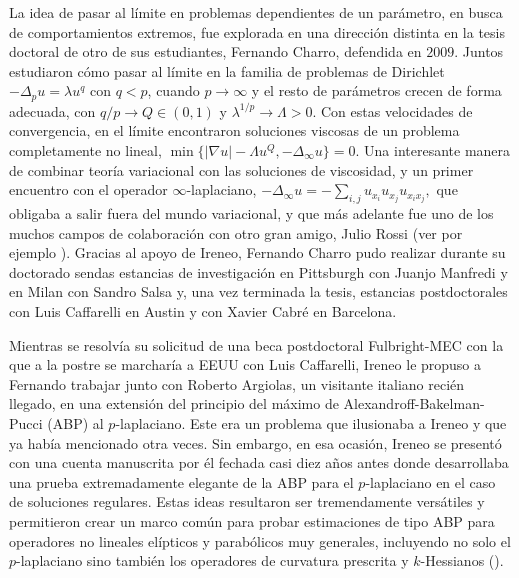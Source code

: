 La idea de pasar al l\'imite en problemas dependientes de un par\'ametro, en busca de comportamientos extremos, fue explorada en una direcci\'on distinta en la tesis doctoral de otro de sus estudiantes, Fernando Charro, defendida en $2009$. Juntos estudiaron c\'omo pasar al l\'imite en la familia de problemas de Dirichlet $ -\Delta_p u = \lambda u^q $ con $ q<p$, cuando $ p \to \infty $ y el resto de par\'ametros crecen de forma adecuada, con $ q/p \to Q \in (0,1) $ y $ \lambda^{1/p} \to \Lambda >0$. Con estas velocidades de convergencia, en el l\'imite encontraron soluciones viscosas de un problema completamente no lineal, $\min \{ |\nabla u|-\Lambda u^Q, - \Delta_{\infty} u \} = 0 $. Una interesante manera de combinar teor\'ia variacional con las soluciones de viscosidad, y un primer encuentro con el operador $\infty$-laplaciano, $-\Delta_{\infty} u = - \sum\limits_{i,j} u_{x_i} u_{x_j} u_{x_i x_j},$ que obligaba a salir fuera del mundo variacional, y que m\'as adelante fue uno de los muchos campos de colaboraci\'on con otro gran amigo, {Julio Rossi} {(ver por ejemplo \cite{GMPR})}. 
Gracias al apoyo de Ireneo, Fernando Charro pudo realizar 
durante su doctorado sendas estancias de investigaci\'on  en Pittsburgh  con Juanjo Manfredi y en Milan con Sandro Salsa y, una vez terminada la tesis, estancias postdoctorales  con Luis Caffarelli en Austin y con Xavier Cabr\'e en Barcelona.

Mientras se resolv\'ia su solicitud de una beca postdoctoral Fulbright-MEC con la que a la postre se marchar\'ia a EEUU con Luis Caffarelli, Ireneo le propuso a Fernando  trabajar junto con {Roberto Argiolas}, un visitante italiano reci\'en llegado, en una extensi\'on del principio del m\'aximo de Alexandroff-Bakelman-Pucci (ABP) al $p$-laplaciano. Este era un problema que ilusionaba a Ireneo y que ya hab\'ia mencionado otra veces. Sin embargo, en esa ocasi\'on, Ireneo se present\'o con una cuenta manuscrita por \'el fechada casi diez a\~nos antes donde desarrollaba una prueba extremadamente elegante de la ABP para el $p$-laplaciano en el caso de soluciones regulares. Estas ideas resultaron ser tremendamente vers\'atiles y permitieron crear un marco com\'un para probar estimaciones de tipo ABP para operadores no lineales el\'ipticos y parab\'olicos muy generales, incluyendo no solo el $p$-laplaciano sino tambi\'en los operadores de curvatura prescrita y $k$-Hessianos {(\cite{ACP})}.


